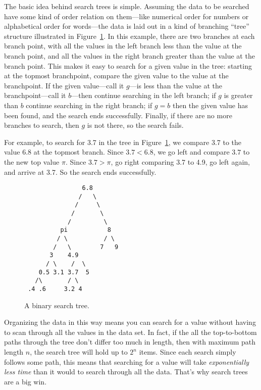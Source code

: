 \begin{definition}
The basic idea behind search trees is simple.  Assuming the data to be
searched have some kind of order relation on them---like numerical order
for numbers or alphabetical order for words---the data is laid out in
a kind of branching ``tree'' structure illustrated in
Figure~\ref{searchtree1}.  In this example, there are two branches at
each branch point, with all the values in the left branch less than
the value at the branch point, and all the values in the right branch
greater than the value at the branch point.  This makes it easy to
search for a given value in the tree: starting at the topmost
branchpoint, compare the given value to the value at the branchpoint.
If the given value---call it $g$---is less than the value at the
branchpoint---call it $b$---then continue searching in the left
branch; if $g$ is greater than $b$ continue searching in the right
branch; if $g = b$ then the given value has been found, and the search
ends successfully.  Finally, if there are no more branches to search,
then $g$ is not there, so the search fails.

For example, to search for 3.7 in the tree in Figure~\ref{searchtree1},
we compare 3.7 to the value 6.8 at the topmost branch.  Since $3.7 <
6.8$, we go left and compare $3.7$ to the new top value $\pi$.  Since
$3.7 > \pi$, go right comparing 3.7 to 4.9, go left again, and arrive
at 3.7. So the search ends successfully.

\begin{figure}

\begin{center}
\begin{verbatim}
                6.8
               /   \
              /     \
             /       \
            /         \
          pi           8  
         / \          / \
        /   \        7   9
       3    4.9  
      / \    /  \
    0.5 3.1 3.7  5
   /\       / \
 .4 .6     3.2 4 
\end{verbatim}
\end{center}

\caption{A binary search tree.}

\label{searchtree1}

\end{figure}

Organizing the data in this way means you can search for a value
without having to scan through all the values in the data set.  In
fact, if the all the top-to-bottom paths through the tree don't differ
too much in length, then with maximum path length $n$, the search tree
will hold up to $2^n$ items.  Since each search simply follows some
path, this means that searching for a value will take
\emph{exponentially less time} than it would to search through all the
data.  That's why search trees are a big win.


\end{definition}
